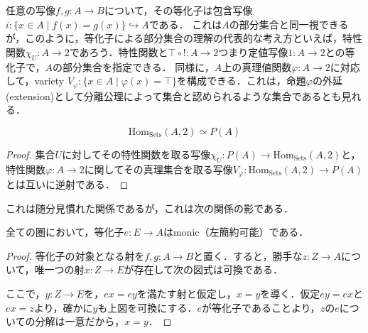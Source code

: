 \documentclass[uplatex, dvipdfmx]{jsarticle}
\begin{document}
\begin{example}[Setsでは等化子は部分集合と同一視できる]\label{example-equalizer-Sets}
    任意の写像$f,g:A\to B$について，その等化子は包含写像$i:\{ x\in A\mid f(x)=g(x) \}\hookrightarrow A$である．
    これは$A$の部分集合と同一視できるが，このように，等化子による部分集合の理解の代表的な考え方といえば，特性関数$\chi_U:A\to 2$であろう．特性関数と$\top\circ !:A\to 2$つまり定値写像$1:A\to 2$との等化子で，$A$の部分集合を指定できる．
    同様に，$A$上の真理値関数$\varphi:A\to 2$に対応して，variety $V_\varphi:\{x\in A\mid \varphi(x)=\top\}$を構成できる．これは，命題$\varphi$の外延(extension)として分離公理によって集合と認められるような集合であるとも見れる．
    \begin{proposition*}[等化子の文脈で]
        \[ \mathrm{Hom}_{\mathrm{Sets}}(A,2)\simeq P(A) \]
    \end{proposition*}
    \begin{proof}
        集合$U$に対してその特性関数を取る写像$\chi_U:P(A)\to\mathrm{Hom}_{\mathrm{Sets}}(A,2)$と，特性関数$\varphi:A\to 2$に関してその真理集合を取る写像$V_\varphi:\mathrm{Hom}_{\mathrm{Sets}}(A,2)\to P(A)$とは互いに逆射である．
    \end{proof}
    これは随分見慣れた関係であるが，これは次の関係の影である．
    \begin{proposition}\label{prop-equalizer-monic}
        全ての圏において，等化子$e:E\to A$はmonic（左簡約可能）である．
    \end{proposition}
    \begin{proof}
        等化子の対象となる射を$f,g:A\to B$と置く．すると，勝手な$z:Z\to A$について，唯一つの射$x:Z\to E$が存在して次の図式は可換である．
        \begin{center}\end{center}
        ここで，$y:Z\to E$を，$ex=ey$を満たす射と仮定し，$x=y$を導く．仮定$ey=ex$と$ex=z$より，確かに$y$も上図を可換にする．$e$が等化子であることより，$z$の$e$についての分解は一意だから，$x=y$．
    \end{proof}
\end{example}
\end{document}
